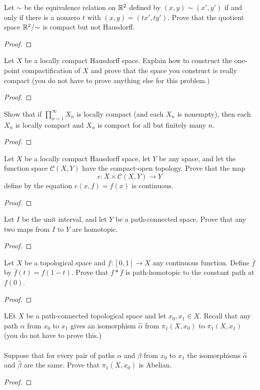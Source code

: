 \begin{problem}
Let $\sim$ be the equivalence relation on $\mathbb{R}^2$ defined by
$(x,y)\sim(x',y')$ if and only if there is a nonzero $t$ with
$(x,y)=(tx',ty')$. Prove that the quotient space $\mathbb{R}^2/{\sim}$
is compact but not Hausdorff.
\end{problem}
\begin{proof}
\end{proof}
\begin{problem}
Let $X$ be a locally compact Hausdorff space. Explain how to
construct the one-point compactification of $X$ and prove that
the space you construct is really compact (you do not have to
prove anything else for this problem.)
\end{problem}
\begin{proof}
\end{proof}
\begin{problem}
Show that if $\prod_{n=1}^\infty X_n$ is locally compact (and
each $X_n$ is nonempty), then each $X_n$ is locally compact and
$X_n$ is compact for all but finitely many $n$.
\end{problem}
\begin{proof}
\end{proof}
\begin{problem}
Let $X$ be a locally compact Hausdorff space, let $Y$ be any
space, and let the function space $\mathcal{C}(X,Y)$ have the
compact-open topology. Prove that the map
\[
e\colon X\times\mathcal{C}(X,Y)\to Y
\]
define by the equation $e(x,f)=f(x)$ is continuous.
\end{problem}
\begin{proof}
\end{proof}
\begin{problem}
Let $I$ be the unit interval, and let $Y$ be a path-connected
space. Prove that any two maps from $I$ to $Y$ are homotopic.
\end{problem}
\begin{proof}
\end{proof}
\begin{problem}
Let $X$ be a topological space and $f\colon[0,1]\to X$ any
continuous function. Define $\bar f$ by $\bar f(t)=f(1-t)$. Prove
that $f*\bar f$ is path-homotopic to the constant path at $f(0)$.
\end{problem}
\begin{proof}
\end{proof}
\begin{problem}
LEt $X$ be a path-connected topological space and let $x_0,x_1\in
X$. Recall that any path $\alpha$ from $x_0$ to $x_1$  gives an
isomorphism $\hat\alpha$ from $\pi_1(X,x_0)$ to $\pi_1(X,x_1)$
(you do not have to prove this.)
\\\\
Suppose that for every pair of paths $\alpha$ and $\beta$ from
$x_0$ to $x_1$ the isomorphisms $\hat\alpha$ and $\hat\beta$  are
the same. Prove that $\pi_1(X,x_0)$ is Abelian.
\end{problem}
\begin{proof}
\end{proof}

